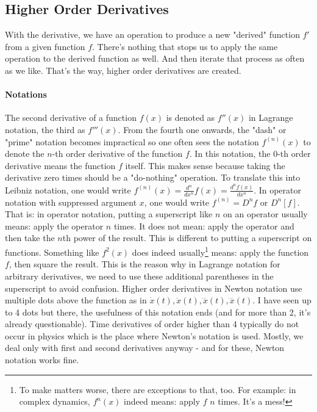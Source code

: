 

\subsection{Higher Order Derivatives}
With the derivative, we have an operation to produce a new "derived" function $f'$ from a given function $f$. There's nothing that stops us to apply the same operation to the derived function as well. And then iterate that process as often as we like. That's the way, higher order derivatives are created. 

\paragraph{Notations} The second derivative of a function $f(x)$ is denoted as $f''(x)$ in Lagrange notation, the third as $f'''(x)$. From the fourth one onwards, the "dash" or "prime" notation becomes impractical so one often sees the notation $f^{(n)}(x)$ to denote the $n$-th order derivative of the function $f$. In this notation, the $0$-th order derivative means the function $f$ itself. This makes sense because taking the derivative zero times should be a "do-nothing" operation. To translate this into Leibniz notation, one would write $f^{(n)}(x) = \frac{d^n}{d x^n} f(x) = \frac{d^n f(x)}{d x^n}$. In operator notation with suppressed argument $x$, one would write $f^{(n)} = D^n f$ or $D^n[f]$. That is: in operator notation, putting a superscript like $n$ on an operator usually means: apply the operator $n$ times. It does not mean: apply the operator and then take the $n$th power of the result. This is different to putting a superscript on functions. Something like $f^2(x)$ does indeed usually\footnote{To make matters worse, there are exceptions to that, too. For example: in complex dynamics, $f^n(x)$ indeed means: apply $f$ $n$ times. It's a mess!} means: apply the function $f$, then square the result. This is the reason why in Lagrange notation for arbitrary derivatives, we need to use these additional parentheses in the superscript to avoid confusion. Higher order derivatives in Newton notation use multiple dots above the function as in $\dot{x}(t), \ddot{x}(t), \dddot{x}(t), \ddddot{x}(t)$. I have seen up to 4 dots but there, the usefulness of this notation ends (and for more than 2, it's already questionable). Time derivatives of order higher than 4 typically do not occur in physics which is the place where Newton's notation is used. Mostly, we deal only with first and second derivatives anyway - and for these, Newton notation works fine. 

